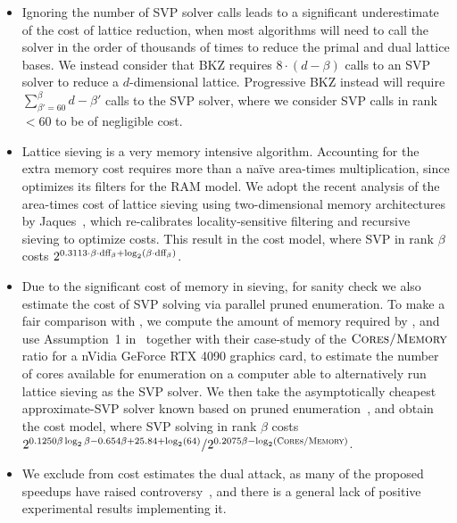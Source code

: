\begin{itemize}
	\item Ignoring the number of SVP solver calls leads to a significant underestimate of the cost of lattice reduction, when most algorithms will need to call the solver in the order of thousands of times to reduce the primal and dual lattice bases. We instead consider that BKZ requires $8 \cdot (d - \beta)$ calls to an SVP solver to reduce a $d$-dimensional lattice. Progressive BKZ instead will require $\sum_{\beta' = 60 }^{\beta} d - \beta'$ calls to the SVP solver, where we consider SVP calls in rank $< 60$ to be of negligible cost.
	\item Lattice sieving is a very memory intensive algorithm. Accounting for the extra memory cost requires more than a na\"ive area-times multiplication, since \cite{SODA:BDGL16} optimizes its filters for the RAM model. We adopt the recent analysis of the area-times cost of lattice sieving using two-dimensional memory architectures by Jaques~\cite{CiC:Jaques24}, which re-calibrates locality-sensitive filtering and recursive sieving to optimize costs. This result in the \cmemsieve cost model, where SVP in rank $\beta$ costs $2^{0.3113 \cdot \beta \cdot \text{dff}_\beta + \log_2(\beta \cdot \text{dff}_\beta)}$.
	\item Due to the significant cost of memory in sieving, for sanity check we also estimate the cost of SVP solving via parallel pruned enumeration. To make a fair comparison with \cmemsieve, we compute the amount of memory required by \cmemsieve, and use Assumption~1 in~\cite{CiC:Jaques24} together with their case-study of the $\textsc{Cores/Memory}$ ratio for a nVidia GeForce RTX 4090 graphics card, to estimate the number of cores available for enumeration on a computer able to alternatively run lattice sieving as the SVP solver. We then take the asymptotically cheapest approximate-SVP solver known based on pruned enumeration~\cite{C:ABLR21}, and obtain the \cparaenum cost model, where SVP solving in rank $\beta$ costs $2^{0.1250 \beta \log_2 \beta - 0.654 \beta + 25.84 + \log_2(64)} / 2^{0.2075 \beta - \log_2(\textsc{Cores/Memory})}$. 
	\item We exclude from cost estimates the dual attack, as many of the proposed speedups have raised controversy~\cite{C:DucPul23,EC:PouShe24,cryptoeprint:2023/1850}, and there is a general lack of positive experimental results implementing it.

\end{itemize}
